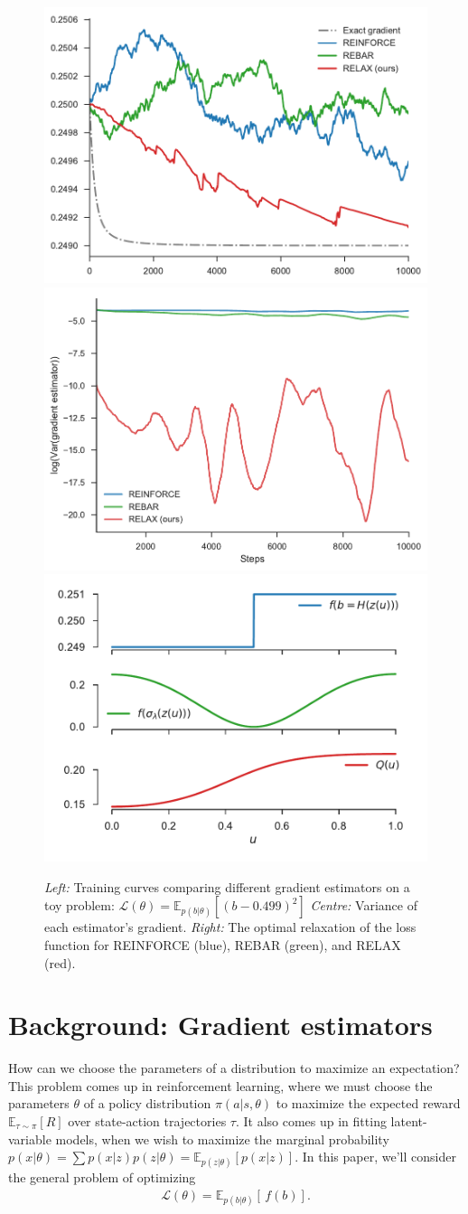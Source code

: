 \documentclass{article}
\newcommand{\discreteDist}{p(b|\theta)}
\newcommand{\loss}{f(b)}
\newcommand{\expectedLoss}{\mathbb{E}_{\discreteDist{}} \! \left[ \, \loss{} \right]}
\newcommand{\E}{\mathbb{E}}
\begin{document}
\begin{figure}[h]
\centering
\includegraphics[width=.325\textwidth]{figures/toy_losses_10000_0_499}
\includegraphics[width=.325\textwidth, clip, trim=3mm 3mm 3mm 3mm]{figures/variance_100_t_499}
\includegraphics[width=.325\textwidth]{figures/relaxations_t499}
\caption{
\emph{Left:} Training curves comparing different gradient estimators on a toy problem: ${\mathcal{L}(\theta) = \E_{p(b|\theta)} [ (b - 0.499)^2 ]}$
\emph{Centre:} Variance of each estimator's gradient.
\emph{Right:} The optimal relaxation of the loss function for REINFORCE (blue), REBAR (green), and RELAX (red).
}
\label{first figure}
\end{figure}


\section{Background: Gradient estimators}
How can we choose the parameters of a distribution to maximize an expectation?
This problem comes up in reinforcement learning, where we must choose the parameters $\theta$ of a policy distribution $\pi(a|s, \theta)$ to maximize the expected reward $\mathbb{E}_{\tau \sim \pi} \left[ R \right]$ over state-action trajectories $\tau$.
It also comes up in fitting latent-variable models, when we wish to maximize the marginal probability ${p(x|\theta) = \sum p(x|z) p(z|\theta) = \mathbb{E}_{p(z|\theta)} \left[ p(x|z) \right]}$.
In this paper, we'll consider the general problem of optimizing
%
\begin{align}
\mathcal{L}(\theta)=\expectedLoss{}.
\end{align}
%
\end{document}
